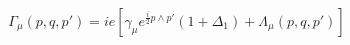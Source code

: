 \begin{equation}
\Gamma_{\mu}(p,q,p')=ie\left[\gamma_{\mu}e^{\frac{i}{2}p\wedge
p'}(1+\Delta_{1})+\Lambda_{\mu}(p,q,p')\right]
\end{equation}


